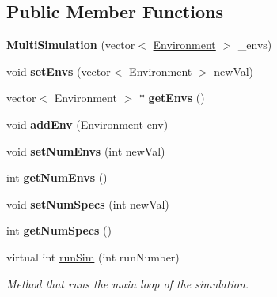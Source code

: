 \subsection*{Public Member Functions}
\begin{DoxyCompactItemize}
\item 
\hypertarget{classMultiSimulation_ad51e5bcf883518c3c817f4d82227f294}{}\label{classMultiSimulation_ad51e5bcf883518c3c817f4d82227f294} 
{\bfseries Multi\+Simulation} (vector$<$ \hyperlink{classEnvironment}{Environment} $>$ \+\_\+envs)
\item 
\hypertarget{classMultiSimulation_a04d145935482000983a462bc59ade87c}{}\label{classMultiSimulation_a04d145935482000983a462bc59ade87c} 
void {\bfseries set\+Envs} (vector$<$ \hyperlink{classEnvironment}{Environment} $>$ new\+Val)
\item 
\hypertarget{classMultiSimulation_a1ad17e4add05c03fe3719aac54c5d0c3}{}\label{classMultiSimulation_a1ad17e4add05c03fe3719aac54c5d0c3} 
vector$<$ \hyperlink{classEnvironment}{Environment} $>$ $\ast$ {\bfseries get\+Envs} ()
\item 
\hypertarget{classMultiSimulation_a445549476e87656b6f153c6e09764b2b}{}\label{classMultiSimulation_a445549476e87656b6f153c6e09764b2b} 
void {\bfseries add\+Env} (\hyperlink{classEnvironment}{Environment} env)
\item 
\hypertarget{classMultiSimulation_a589d57167ba82ab6a1d43e49001c669f}{}\label{classMultiSimulation_a589d57167ba82ab6a1d43e49001c669f} 
void {\bfseries set\+Num\+Envs} (int new\+Val)
\item 
\hypertarget{classMultiSimulation_a357f60562b2907933dc92638a0fae83b}{}\label{classMultiSimulation_a357f60562b2907933dc92638a0fae83b} 
int {\bfseries get\+Num\+Envs} ()
\item 
\hypertarget{classMultiSimulation_a3ae04feb1bf9bae33bf1ed239ff02203}{}\label{classMultiSimulation_a3ae04feb1bf9bae33bf1ed239ff02203} 
void {\bfseries set\+Num\+Specs} (int new\+Val)
\item 
\hypertarget{classMultiSimulation_a2e2c2af3cb981335e92bbeb94c56a382}{}\label{classMultiSimulation_a2e2c2af3cb981335e92bbeb94c56a382} 
int {\bfseries get\+Num\+Specs} ()
\item 
virtual int \hyperlink{classMultiSimulation_a235347d04fd0c7e1a2e35d7a39e77583}{run\+Sim} (int run\+Number)
\begin{DoxyCompactList}\small\item\em Method that runs the main loop of the simulation. \end{DoxyCompactList}\end{DoxyCompactItemize}
